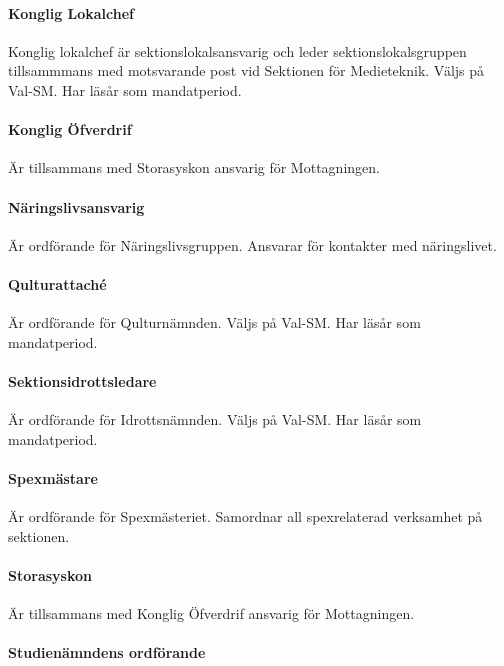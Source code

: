 \documentclass[a4paper,12pt]{article}
\begin{document}
\paragraph{Konglig Lokalchef}

Konglig lokalchef är sektionslokalsansvarig och leder sektionslokalsgruppen tillsammmans med motsvarande post vid Sektionen för Medieteknik. Väljs på Val-SM. Har läsår som mandatperiod.

\paragraph{Konglig Öfverdrif}

Är tillsammans med Storasyskon ansvarig för Mottagningen.

\paragraph{Näringslivsansvarig}

Är ordförande för Näringslivsgruppen. Ansvarar för kontakter med näringslivet.

\paragraph{Qulturattaché}

Är ordförande för Qulturnämnden. Väljs på Val-SM. Har läsår som mandatperiod.

\paragraph{Sektionsidrottsledare}

Är ordförande för Idrottsnämnden. Väljs på Val-SM. Har läsår som mandatperiod.

\paragraph{Spexmästare}

Är ordförande för Spexmästeriet. Samordnar all spexrelaterad verksamhet på sektionen.

\paragraph{Storasyskon}

Är tillsammans med Konglig Öfverdrif ansvarig för Mottagningen.

\paragraph{Studienämndens ordförande}
\end{document}
